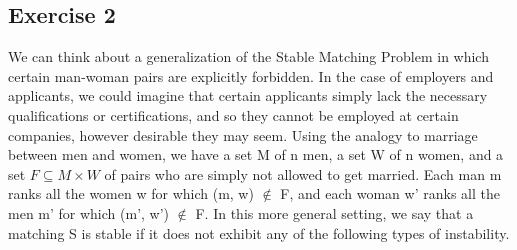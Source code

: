 \documentclass[12pt]{report}
\begin{document}
\subsection{Exercise 2}
We can think about a generalization of the Stable Matching Problem in
which certain man-woman pairs are explicitly forbidden. In the case of
employers and applicants, we could imagine that certain applicants
simply lack the necessary qualifications or certifications, and so
they cannot be employed at certain companies, however desirable they
may seem. Using the analogy to marriage between men and women, we have
a set M of n men, a set W of n women, and a set $ F \subseteq M \times W $ of pairs
who are simply not allowed to get married. Each man m ranks all the
women w for which (m, w) $\notin$ F, and each woman w' ranks all the men m'
for which (m', w') $\notin$ F.  In this more general setting, we say that a
matching S is stable if it does not exhibit any of the following types
of instability.


\end{document}

